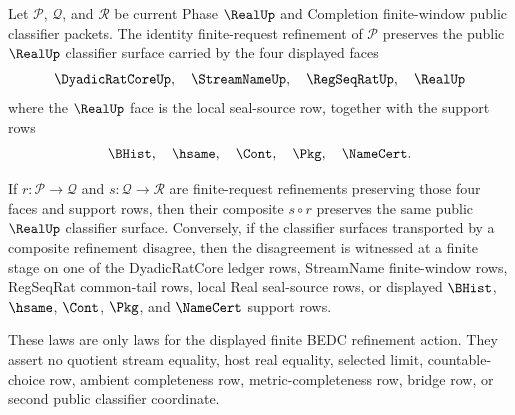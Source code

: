 \begin{theorem}
\label{thm:real-l10-classifier-refinement-category-laws}
Let $\mathcal P$, $\mathcal Q$, and $\mathcal R$ be current Phase $\RealUp$ and Completion finite-window public classifier packets. The identity finite-request refinement of $\mathcal P$ preserves the public $\RealUp$ classifier surface carried by the four displayed faces
$$
\DyadicRatCoreUp,\quad \StreamNameUp,\quad \RegSeqRatUp,\quad \RealUp
$$
where the $\RealUp$ face is the local seal-source row, together with the support rows
$$
\BHist,\quad \hsame,\quad \Cont,\quad \Pkg,\quad \NameCert.
$$

If $r : \mathcal P \to \mathcal Q$ and $s : \mathcal Q \to \mathcal R$ are finite-request refinements preserving those four faces and support rows, then their composite $s \circ r$ preserves the same public $\RealUp$ classifier surface. Conversely, if the classifier surfaces transported by a composite refinement disagree, then the disagreement is witnessed at a finite stage on one of the DyadicRatCore ledger rows, StreamName finite-window rows, RegSeqRat common-tail rows, local Real seal-source rows, or displayed $\BHist$, $\hsame$, $\Cont$, $\Pkg$, and $\NameCert$ support rows.

These laws are only laws for the displayed finite BEDC refinement action. They assert no quotient stream equality, host real equality, selected limit, countable-choice row, ambient completeness row, metric-completeness row, bridge row, or second public classifier coordinate.
\end{theorem}
